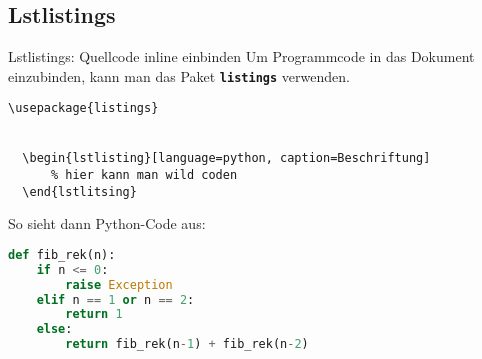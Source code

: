 \subsection{Lstlistings}
\begin{frame}[fragile]{Lstlistings: Quellcode inline einbinden}
Um Programmcode in das Dokument einzubinden, kann man das Paket \textbf{\texttt{listings}} verwenden.
\vspace{2ex}

\begin{lstlisting}[style=tex]
\usepackage{listings}


  \begin{lstlisting}[language=python, caption=Beschriftung]
      % hier kann man wild coden
  \end{lstlitsing}
\end{lstlisting}


So sieht dann Python-Code aus:
\begin{lstlisting}[language=python, caption = Berechnung der n-ten Fibonacci in Python durch Rekursion]
def fib_rek(n):
    if n <= 0:
        raise Exception
    elif n == 1 or n == 2:
        return 1
    else:
        return fib_rek(n-1) + fib_rek(n-2)
\end{lstlisting}

\end{frame}

